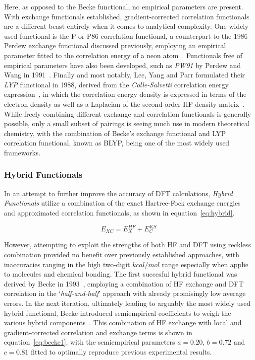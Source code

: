 \documentclass[11pt]{article}
\begin{document}
\bigskip

\noindent Here, as opposed to the Becke functional, no empirical parameters are present.
With exchange functionals established, gradient-corrected correlation functionals are a different beast entirely when it comes to analytical complexity.
One widely used functional is the P or P86 correlation functional, a counterpart to the 1986 Perdew exchange functional discussed previously, employing an empirical parameter fitted to the correlation energy of a neon atom~\cite{Perdew1986_2}.
Functionals free of empirical parameters have also been developed, such as \textit{PW91} by Perdew and Wang in 1991~\cite{Burke1998}.
Finally and most notably, Lee, Yang and Parr formulated their \textit{LYP} functional in 1988, derived from the \textit{Colle-Salvetti} correlation energy expression~\cite{Lee1988}, in which the correlation energy density is expressed in terms of the electron density as well as a Laplacian of the second-order HF density matrix~\cite{Colle1975}.
While freely combining different exchange and correlation functionals is generally possible, only a small subset of pairings is seeing much use in modern theoretical chemistry, with the combination of Becke's exchange functional and LYP correlation functional, known as BLYP, being one of the most widely used frameworks.


\subsubsection{Hybrid Functionals}\label{hybrid}

In an attempt to further improve the accuracy of DFT calculations, \textit{Hybrid Functionals} utilize a combination of the exact Hartree-Fock exchange energies and approximated correlation functionals, as shown in equation~\ref{eq:hybrid}.

\begin{equation}
  E_{XC} = E_X^{HF} + E_C^{KS}
  \label{eq:hybrid}
\end{equation}

\bigskip

\noindent However, attempting to exploit the strengths of both HF and DFT using reckless combination provided no benefit over previously established approaches, with inaccuracies ranging in the high two-digit $kcal/mol$ range especially when applie to molecules and chemical bonding.
The first succesful hybrid functional was derived by Becke in 1993~\cite{Becke1993_hybrid}, employing a combination of HF exchange and DFT correlation in the `\textit{half-and-half}' approach with already promisingly low average errors.
In the next iteration, ultimately leading to arguably the most widely used hybrid functional, Becke introduced semiempirical coefficients to weigh the various hybrid components~\cite{Becke1993a}. 
This combination of HF exchange with local and gradient-corrected correlation and exchange terms is shown in equation~\ref{eq:becke1}, with the semiempirical parameters $a=0.20$, $b=0.72$ and $c=0.81$ fitted to optimally reproduce previous experimental results. 
\end{document}
